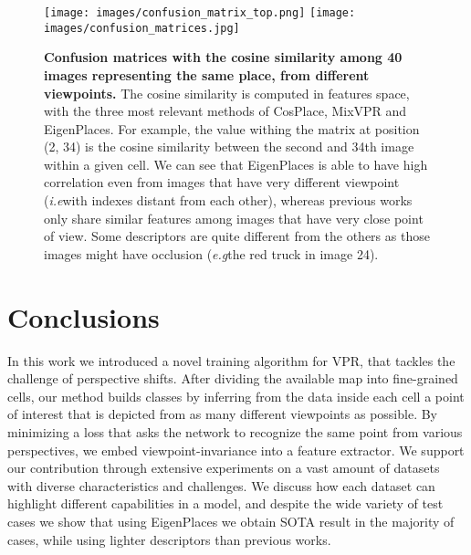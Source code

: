 \documentclass[10pt,twocolumn,letterpaper]{article}
\def\eg{\emph{e.g}\onedot}
\def\ie{\emph{i.e}\onedot}
\begin{document}
\begin{figure}
    \begin{center}
    \texttt{[image: images/confusion\_matrix\_top.png]}
    \texttt{[image: images/confusion\_matrices.jpg]}
    \end{center}
    \caption{
    \textbf{Confusion matrices with the cosine similarity among 40 images representing the same place, from different viewpoints.} The cosine similarity is computed in features space, with the three most relevant methods of CosPlace, MixVPR and EigenPlaces.
    For example, the value withing the matrix at position (2, 34) is the cosine similarity between the second and 34th image within a given cell.    
    We can see that EigenPlaces is able to have high correlation even from images that have very different viewpoint (\ie with indexes distant from each other), whereas previous works only share similar features among images that have very close point of view. Some descriptors are quite different from the others as those images might have occlusion (\eg the red truck in image 24).}
    \label{fig:confusion_matrices}
\end{figure}
  
\section{Conclusions}
\label{sec:conclusions}

In this work we introduced a novel training algorithm for VPR, that tackles the challenge of perspective shifts.
After dividing the available map into fine-grained cells, our method builds classes by inferring from the data inside each cell a point of interest that is depicted from as many different viewpoints as possible. By minimizing a loss that asks the network to recognize the same point from various perspectives, we embed viewpoint-invariance into a feature extractor.
We support our contribution through extensive experiments on a vast amount of datasets with diverse characteristics and challenges. We discuss how each dataset can highlight different capabilities in a model, and despite the wide variety of test cases we show that using EigenPlaces we obtain SOTA result in the majority of cases, while using lighter descriptors than previous works. 

 
{\small


}

\appendix
\end{document}

